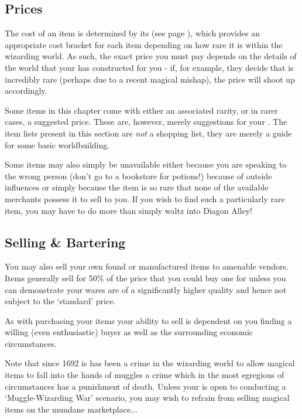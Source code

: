 \subsection{Prices}

The cost of an item is determined by its (see page \pageref{S:ItemRarity}), which provides an appropriate cost bracket for each item depending on how rare it is within the wizarding world. As such, the exact price you must pay depends on the details of the world that your  has constructed for you - if, for example, they decide that  is incredibly rare (perhaps due to a recent magical mishap), the price will shoot up accordingly. 

Some items in this chapter come with either an associated rarity, or in rarer cases, a suggested price. These are, however, merely suggestions for your . The item lists present in this section are {\it not} a shopping list, they are merely a guide for some basic worldbuilding.

Some items may also simply be unavailable \minus{} either because you are speaking to the wrong person (don't go to a bookstore for potions!)\comma{} because of outside influences\comma{} or simply because the item is so rare that none of the available merchants possess it to sell to you. If you wish to find such a particularly rare item, you may have to do more than simply waltz into Diagon Alley! 

\subsection{Selling \& Bartering}

You may also sell your own found or manufactured items to amenable vendors. Items generally sell for 50\% of the price that you could buy one for\comma{} unless you can demonstrate your wares are of a significantly higher quality\comma{} and hence not subject to the `standard' price. 

As with purchasing your items\comma{} your ability to sell is dependent on you finding a willing (even enthusiastic) buyer\comma{} as well as the surrounding economic circumstances. 

Note that since 1692 is has been a crime in the wizarding world to allow magical items to fall into the hands of muggles \minus{} a crime which\comma{} in the most egregious of circumstances\comma{} has a punishment of death. Unless your  is open to conducting a `Muggle-Wizarding War' scenario, you may wish to refrain from selling magical items on the mundane marketplace...


